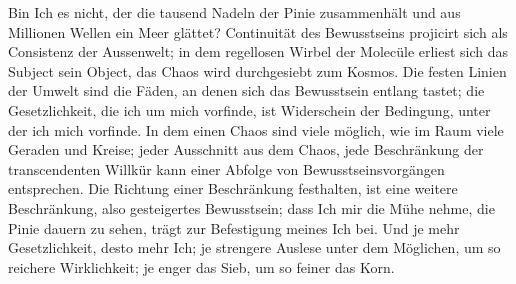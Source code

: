 Bin Ich es nicht, der die tausend Nadeln der Pinie zusammenhält und aus Millionen Wellen ein Meer glättet? Continuität des Bewusstseins projicirt sich als Consistenz der Aussenwelt; in dem regellosen Wirbel der Molecüle erliest sich das Subject sein Object, das Chaos wird durchgesiebt zum Kosmos. Die festen Linien der Umwelt sind die Fäden, an denen sich das Bewusstsein entlang tastet; die Gesetzlichkeit, die ich um mich vorfinde, ist Widerschein der Bedingung, unter der ich mich vorfinde. In dem einen Chaos sind viele  möglich, wie im Raum viele Geraden und Kreise; jeder Ausschnitt aus dem Chaos, jede Beschränkung der transcendenten Willkür kann einer Abfolge von Bewusstseinsvorgängen entsprechen. Die Richtung einer Beschränkung festhalten, ist eine weitere Beschränkung, also gesteigertes Bewusstsein; dass Ich mir die Mühe nehme, die Pinie dauern zu sehen, trägt zur Befestigung meines Ich bei. Und je mehr Gesetzlichkeit, desto mehr Ich; je strengere Auslese unter dem Möglichen, um so reichere Wirklichkeit; je enger das Sieb, um so feiner das Korn.
\par

